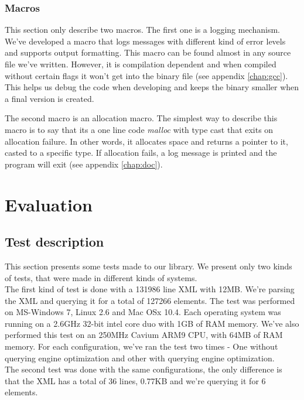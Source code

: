 \documentclass[a4paper]{report}
\begin{document}
	\subsection{Macros}
		This section only describe two macros. The first one is a logging mechanism. We've developed a macro that logs messages with different kind of error levels and supports output formatting. This macro can be found	almost in any source file we've written. However, it is compilation dependent and when compiled without certain flags it won't get into the binary file (see appendix \ref{chap:gcc}). This helps us debug the code when developing and keeps the binary smaller when a final version is created.

		The second macro is an allocation macro. The simplest way to describe this macro is to say that its a one line code \emph{malloc} with type cast that exits on allocation failure. In other words, it allocates space and returns a pointer to it, casted to a specific type. If allocation fails, a log message is printed and the program will exit (see appendix \ref{chap:doc}).


\chapter{Evaluation}\label{chap:eval}

\section{Test description}\label{sec:testdesc}
	This section presents some tests made to our library. We present only two kinds of tests, that were made in different kinds of systems.\\

	The first kind of test is done with a 131986 line XML with 12MB. We're parsing the XML and querying it for a total of 127266 elements. The test was performed on MS-Windows 7, Linux 2.6 and Mac OSx 10.4. Each
	operating system was running on a 2.6GHz 32-bit intel core duo with 1GB of RAM memory. We've also performed this test on an 250MHz Cavium ARM9 CPU, with 64MB of RAM memory. For each configuration, we've ran
	the test two times - One without querying engine optimization and other with querying engine optimization. \\

	The second test was done with the same configurations, the only difference is that the XML has a total of 36 lines, 0.77KB and we're querying it for 6 elements.\\
\end{document}
